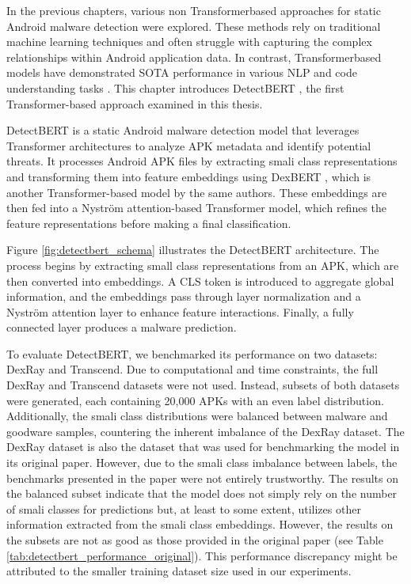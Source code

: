 In the previous chapters, various non Transformerbased approaches for 
static Android malware detection were explored. 
These methods rely on traditional machine learning techniques and often 
struggle with capturing the complex relationships within Android application data. 
In contrast, Transformerbased models have demonstrated SOTA 
performance in various NLP and code understanding tasks \cite{transformer_sota}. 
This chapter introduces DetectBERT \cite{detectbert}, the first Transformer-based approach examined 
in this thesis.

DetectBERT is a static Android malware detection model that leverages Transformer 
architectures to analyze APK metadata and identify potential threats. 
It processes Android APK files by extracting smali class representations and 
transforming them into feature embeddings using DexBERT \cite{dexbert}, which is another 
Transformer-based model by the same authors. 
These embeddings are then fed into a Nyström attention-based Transformer model, 
which refines the feature representations before making a final classification.

Figure \ref{fig:detectbert_schema} illustrates the DetectBERT architecture. 
The process begins by extracting small class representations from an APK, 
which are then converted into embeddings. 
A CLS token is introduced to aggregate global information, 
and the embeddings pass through layer normalization and a Nyström \cite{nystromformer} attention layer 
to enhance feature interactions. 
Finally, a fully connected layer produces a malware prediction.

To evaluate DetectBERT, we benchmarked its performance on two datasets: 
DexRay and Transcend. 
Due to computational and time constraints, 
the full DexRay and Transcend datasets were not used. 
Instead, subsets of both datasets were generated, each containing 20,000 
APKs with an even label distribution. 
Additionally, the smali class distributions were balanced between malware and 
goodware samples, countering the inherent imbalance of the DexRay dataset. 
The DexRay dataset is also the dataset that was used for benchmarking the model 
in its original paper. However, due to the smali class imbalance between labels, 
the benchmarks presented in the paper were not entirely trustworthy. 
The results on the balanced subset indicate that the model does not simply rely 
on the number of smali classes for predictions but, at least to some extent, 
utilizes other information extracted from the smali class embeddings. 
However, the results on the subsets are not as good as those provided in the 
original paper (see Table \ref{tab:detectbert_performance_original}). 
This performance discrepancy might be attributed 
to the smaller training dataset size used in our experiments.

